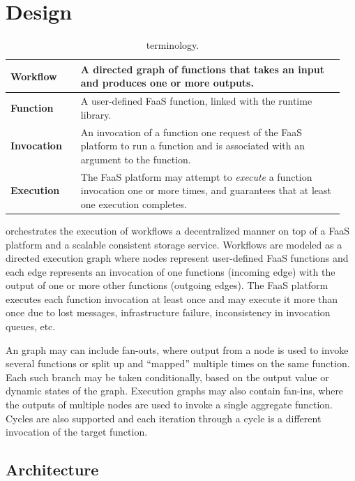 \section{Design}\label{sec:design}

\begin{table}[]
  \centering
  \begin{tabular}{|m{0.2\linewidth}|m{0.75\linewidth}|}
    \hline
  \textbf{Workflow} & A directed graph of functions that takes an input and produces one or more outputs. \\
    \hline
  \textbf{Function} & A user-defined FaaS function, linked with the \name{} runtime library. \\
    \hline
  \textbf{Invocation} & An invocation of a function one request of the FaaS platform to run a function and is associated with an argument to the function. \\
    \hline
  \textbf{Execution} & The FaaS platform may attempt to \emph{execute} a function invocation one or more times, and guarantees that at least one execution completes. \\
    \hline
  \end{tabular}
  \caption{\name{} terminology.}
  \label{table:terms}
\end{table}

\name{} orchestrates the execution of workflows a decentralized manner on top of
a FaaS platform and a scalable consistent storage service. Workflows are modeled
as a directed execution graph where nodes represent user-defined FaaS functions
and each edge represents an invocation of one functions (incoming edge) with the
output of one or more other functions (outgoing edges). The FaaS platform
executes each function invocation at least once and may execute it more than
once due to lost messages, infrastructure failure, inconsistency in invocation
queues, etc.

An \name{} graph may can include fan-outs, where output from a node is used to
invoke several functions or split up and ``mapped'' multiple times on the same
function. Each such branch may be taken conditionally, based on the output value
or dynamic states of the graph. Execution graphs may also contain fan-ins, where
the outputs of multiple nodes are used to invoke a single aggregate function.
Cycles are also supported and each iteration through a cycle is a different
invocation of the target function.

\subsection{Architecture}\label{sec:design:architecture}

